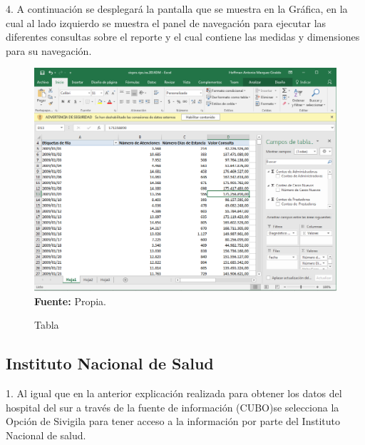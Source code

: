\documentclass[a4paper,openright,12pt]{book}
\theoremstyle{definition}
\theoremstyle{remark}
\begin{document}
4. A continuación se desplegará la pantalla que se muestra en la Gráfica, en la cual al lado izquierdo se muestra el panel de navegación para ejecutar las diferentes consultas sobre el reporte y el cual contiene las medidas y dimensiones para su navegación.

\begin{figure}[h]
\centering
\caption{Tabla } 
\includegraphics[scale=0.3]{Rips4}
\label{fig:Rips4}
\\ \textbf{Fuente:} Propia.
\end{figure}


\subsection{Instituto Nacional de Salud}


1. Al igual que en la anterior explicación realizada para obtener los datos del hospital del sur a través de la fuente de información (CUBO)se selecciona la Opción de Sivigila para tener acceso a la información por parte del Instituto Nacional de salud.
\end{document}
